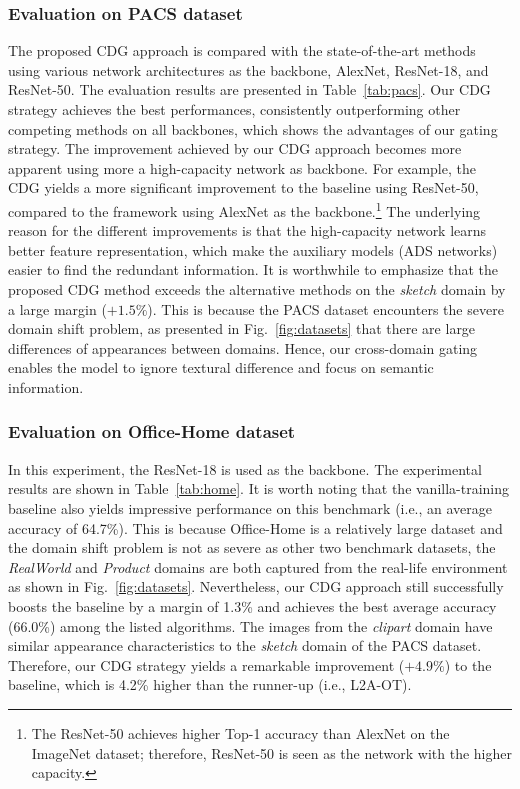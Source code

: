 \subsubsection{Evaluation on PACS dataset}
The proposed CDG approach is compared with the state-of-the-art methods using various network architectures as the backbone, \ie AlexNet, ResNet-18, and ResNet-50. The evaluation results are presented in Table~\ref{tab:pacs}. Our CDG strategy achieves the best performances, consistently outperforming other competing methods on all backbones, which shows the advantages of our gating strategy. The improvement achieved by our CDG approach becomes more apparent using more a high-capacity network as backbone. For example, the CDG yields a more significant improvement to the baseline using ResNet-50, compared to the framework using AlexNet as the backbone.\footnote{The ResNet-50 achieves higher Top-1 accuracy than AlexNet on the ImageNet dataset; therefore, ResNet-50 is seen as the network with the higher capacity.} The underlying reason for the different improvements is that the high-capacity network learns better feature representation, which make the auxiliary models (ADS networks) easier to find the redundant information. It is worthwhile to emphasize that the proposed CDG method exceeds the alternative methods on the \textit{sketch} domain by a large margin ($+1.5\%$). This is because the PACS dataset encounters the severe domain shift problem, as presented in Fig.~\ref{fig:datasets} that there are large differences of appearances between domains. Hence, our cross-domain gating enables the model to ignore textural difference and focus on semantic information.


\subsubsection{Evaluation on Office-Home dataset}
In this experiment, the ResNet-18 is used as the backbone. The experimental results are shown in Table~\ref{tab:home}. It is worth noting that the vanilla-training baseline also yields impressive performance on this benchmark (i.e., an average accuracy of 64.7\%). This is because Office-Home is a relatively large dataset and the domain shift problem is not as severe as other two benchmark datasets, \eg the \textit{RealWorld} and \textit{Product} domains are both captured from the real-life environment as shown in Fig.~\ref{fig:datasets}. Nevertheless, our CDG approach still successfully boosts the baseline by a margin of 1.3\% and achieves the best average accuracy (66.0\%) among the listed algorithms. The images from the \textit{clipart} domain have similar appearance characteristics to the \textit{sketch} domain of the PACS dataset. Therefore, our CDG strategy yields a remarkable improvement ($+4.9\%$) to the baseline, which is 4.2\% higher than the runner-up (i.e., L2A-OT). 


